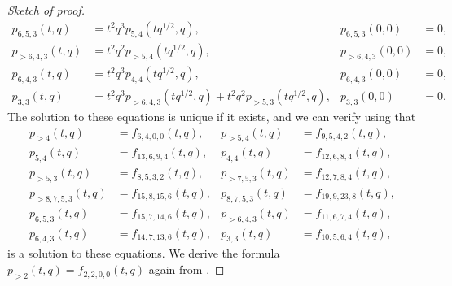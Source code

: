 \documentclass[a4paper, 12pt, reqno]{amsart}
\theoremstyle{remark}
\numberwithin{equation}{subsection}
\begin{document}
\begin{proof}[Sketch of proof]
\begin{align*}
    p_{6, 5, 3}(t, q) &= t^2q^3p_{5, 4}(tq^{1/2}, q), &p_{6, 5, 3}(0, 0) &= 0, \\
    p_{>6, 4, 3}(t, q) &= t^2q^2p_{>5, 4}(tq^{1/2}, q), &p_{>6, 4, 3}(0, 0) &= 0, \\
    p_{6, 4, 3}(t, q) &= t^2q^3p_{4, 4}(tq^{1/2}, q), &p_{6, 4, 3}(0, 0) &= 0, \\
    p_{3, 3}(t, q) &= t^2q^3p_{>6, 4, 3}(tq^{1/2}, q) + t^2q^2p_{>5, 3}(tq^{1/2}, q), &p_{3, 3}(0, 0) &= 0.
  \end{align*}
  The solution to these equations is unique if it exists, and we can verify using  that
  \begin{align*}
    p_{>4}(t, q) &= f_{6, 4, 0, 0}(t, q), &p_{>5, 4}(t, q) &= f_{9, 5, 4, 2}(t, q), \\
    p_{5, 4}(t, q) &= f_{13, 6, 9, 4}(t, q), &p_{4, 4}(t, q) &= f_{12, 6, 8, 4}(t, q), \\
    p_{>5, 3}(t, q) &= f_{8, 5, 3, 2}(t, q), &p_{>7, 5, 3}(t, q) &= f_{12, 7, 8, 4}(t, q), \\
    p_{>8, 7, 5, 3}(t, q) &= f_{15, 8, 15, 6}(t, q), &p_{8, 7, 5, 3}(t, q) &= f_{19, 9, 23, 8}(t, q), \\
    p_{6, 5, 3}(t, q) &= f_{15, 7, 14, 6}(t, q), &p_{>6, 4, 3}(t, q) &= f_{11, 6, 7, 4}(t, q), \\
    p_{6, 4, 3}(t, q) &= f_{14, 7, 13, 6}(t, q), &p_{3, 3}(t, q) &= f_{10, 5, 6, 4}(t, q),
  \end{align*}
  is a solution to these equations.
  We derive the formula $p_{>2}(t, q) = f_{2, 2, 0, 0}(t, q)$ again from .


\end{proof}
\end{document}
